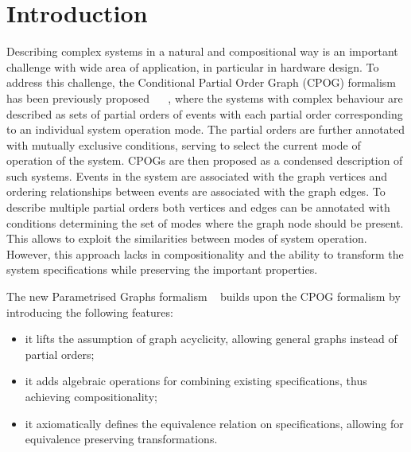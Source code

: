 
\newcommand{\seq}{\gg}
\newcommand{\hyp}{\text{-}}





\section{Introduction}

Describing complex systems in a natural and compositional way is an important challenge with wide area of application, in particular in hardware design.
To address this challenge, the Conditional Partial Order Graph (CPOG) formalism has been previously proposed ~\cite{2009_mokhov_phd} ~\cite{2010_mokhov_ieee}, where the systems with
complex behaviour are described as sets of partial orders of events with each partial order corresponding to an individual system operation mode.
The partial orders are further annotated with mutually exclusive conditions,
serving to select the current mode of operation of the system. CPOGs are then proposed as a condensed description of such systems.
Events in the system are associated with the graph vertices and ordering relationships between events are associated with the graph edges.
To describe multiple partial orders both vertices and edges can be annotated with conditions determining the set of modes 
where the graph node should be present. This allows to exploit the similarities between modes of system operation.
However, this approach lacks in compositionality and the ability to transform the system specifications while preserving the important properties.

The new Parametrised Graphs formalism ~\cite{2011_mokhov_pg} builds upon the CPOG formalism by introducing the following features:
\begin{itemize}
\item{it lifts the assumption of graph acyclicity, allowing general graphs instead of partial orders;}
\item{it adds algebraic operations for combining existing specifications, thus achieving compositionality;}
\item{it axiomatically defines the equivalence relation on specifications, allowing for equivalence preserving transformations.}
\end{itemize}

